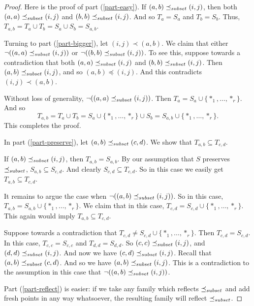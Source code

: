 \documentclass[12pt]{article}
\theoremstyle{definition}
\newcommand{\set}[1]{\{ #1 \}}
\newcommand{\nott}{\neg}
\begin{document}
\begin{proof}
Here is the proof of part (\ref{part-easy}).
If $(a,b)\preceq_{\scriptsize subset} (i,j)$, then both $(a,a)\preceq_{\scriptsize subset} (i,j)$ and $(b,b)\preceq_{\scriptsize subset} (i,j)$.
And so $T_a = S_a$ and $T_b = S_b$.
 Thus, $T_{a,b} = T_a \cup T_b = S_a \cup S_b = S_{a,b}$.
 
 Turning to part (\ref{part-bigger}), let  $(i,j) \prec (a,b)$.
 We claim that either $\nott ((a,a) \precsubseteq (i,j))$ or $\nott ((b,b) \precsubseteq (i,j))$.
To see this, suppose towards a contradiction that both $(a,a) \preceq_{\scriptsize subset}(i,j)$ and $(b,b) \preceq_{\scriptsize subset} (i,j)$.
 Then $(a,b) \preceq_{\scriptsize subset} (i,j)$, and so $(a,b) \preceq (i,j)$.  And this contradicts 
$(i,j) \prec (a,b)$.

Without loss of generality, 
$\nott ((a,a) \precsubseteq (i,j))$.
Then $T_a = S_a \cup \set{*_1,\ldots, *_r}$.
And so
\[ T_{a,b} = T_a \cup T_b = S_a\cup\set{*_1,\ldots, *_r} \cup S_b = S_{a,b}\cup\set{*_1,\ldots, *_r}.\]
This completes the proof.


In  part (\ref{part-preserve}),
let $(a,b) \preceq_{\scriptsize subset} (c,d)$.  We show that $T_{a,b} \subseteq T_{c,d}$.

If $(a,b)\preceq_{\scriptsize subset} (i,j)$, then $T_{a,b} = S_{a,b}$.
By our assumption that $S$ preserves $\preceq_{\scriptsize subset}$, $S_{a,b} \subseteq S_{c,d}$.
And clearly $S_{c,d} \subseteq T_{c,d}$.
So in this case we easily get $T_{a,b} \subseteq T_{c,d}$.

It remains to argue the case when
$\nott((a,b)\precsubseteq (i,j))$.
So in this case,  
$T_{a,b} =  S_{a,b} \cup \set{*_1,\ldots, *_r}$.
We claim that in this case,
$T_{c,d} =  S_{c,d} \cup \set{*_1,\ldots, *_r}$.
This again would imply $T_{a,b} \subseteq T_{c,d}$.

Suppose towards a contradiction that 
$T_{c,d} \neq  S_{c,d} \cup \set{*_1,\ldots, *_r}$.
Then $T_{c,d} =  S_{c,d} $.
In this case, $T_{c,c} = S_{c,c}$ and $T_{d,d} = S_{d,d}$.
So  $(c,c)\preceq_{\scriptsize subset} (i,j)$,
and   $(d,d)\preceq_{\scriptsize subset} (i,j)$.
And now we have   $(c,d)\preceq_{\scriptsize subset} (i,j)$.
Recall that 
$(a,b) \preceq_{\scriptsize subset} (c,d)$. 
And so we have $(a,b) \preceq_{\scriptsize subset} (i,j)$. 
This is a contradiction to the assumption in this case that 
$\nott((a,b)\precsubseteq (i,j))$.

Part (\ref{part-reflect}) is easier:  if we take any family which reflects $\preceq_{\scriptsize subset}$ and
add fresh points in any way whatsoever, the resulting family will reflect $\preceq_{\scriptsize subset}$.
\end{proof}


\end{document}
